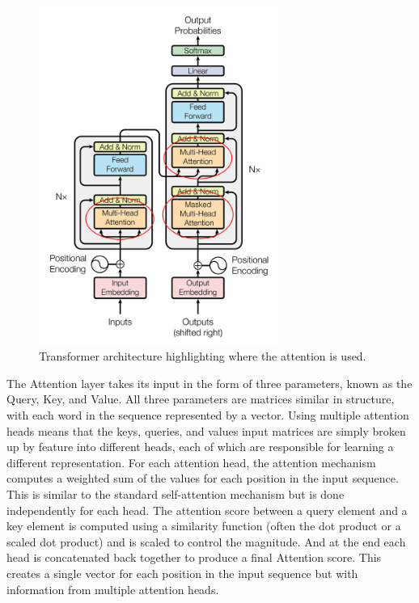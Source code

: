 \documentclass[../main.tex]{subfiles}
\begin{document}
\begin{figure}[ht]
    \centering
    \includegraphics[width=0.7\textwidth]{images/Transformer.png}
    \caption{Transformer architecture highlighting where the attention is used.}
    \label{fig:transformer}
\end{figure}

The Attention layer takes its input in the form of three parameters, known as the Query, Key, and Value. All three parameters are matrices similar in structure, with each word in the sequence represented by a vector. Using multiple attention heads means that the keys, queries, and values input matrices are simply broken up by feature into different heads, each of which are responsible for learning a different representation. For each attention head, the attention mechanism computes a weighted sum of the values for each position in the input sequence. This is similar to the standard self-attention mechanism but is done independently for each head. The attention score between a query element and a key element is computed using a similarity function (often the dot product or a scaled dot product) and is scaled to control the magnitude. And at the end each head is concatenated back together to produce a final Attention score. This creates a single vector for each position in the input sequence but with information from multiple attention heads.
\end{document}
